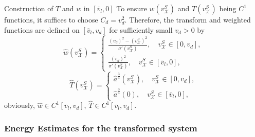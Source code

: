 \documentclass[12pt,reqno]{amsart}
\numberwithin{equation}{section}
\def\ah{\hat{a}}
\def\th{\hat{T}}
\def\wh{\hat{w}}
\def\vsx{v^S_{\mathcal{X}}}
\def\avl{\overline{v}_l}
\def\X{\mathcal{X}}
\begin{document}
\begin{part}{Construction of $T$ and $w$ in $[\avl,0]$}
	To ensure $w(\vsx)$ and $T(\vsx)$ being $C^1$ functions, it suffices to choose $C_d=v_d^2$. Therefore, the transform and weighted functions are defined on $[\avl, v_d]$ for sufficiently small $v_d>0$ by 
	\begin{equation}\label{wh}
		\wh(\vsx)=
		\begin{cases}
			\frac{(v_d)^2-(\vsx)^2}{\sigma'(\vsx)},\quad \vsx \in [0,v_d],\\
			\frac{(v_d)^2}{\sigma'(\vsx)},\quad \vsx \in [\avl,0],
		\end{cases}
	\end{equation}
	\begin{equation}\label{th}
		\th(\vsx)=
		\begin{cases}
			\ah^\frac{3}{4}(\vsx),\quad \vsx \in [0,v_d],\\
			\ah^\frac{3}{4}(0),\quad \vsx \in [\avl,0],
		\end{cases}
	\end{equation}
	obviously, $\wh \in C^1[\avl,v_d]$, $\th \in C^1[\avl,v_d]$.
\end{part}


\subsubsection{Energy Estimates for the transformed system}\label{construction of function2}

\end{document}

